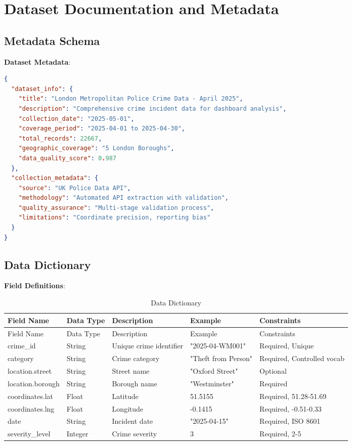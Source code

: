 \documentclass[12pt,a4paper]{article}
\begin{document}
\section{Dataset Documentation and Metadata}

\subsection{Metadata Schema}

\textbf{Dataset Metadata}:
\begin{lstlisting}[language=json, caption=Metadata Structure]
{
  "dataset_info": {
    "title": "London Metropolitan Police Crime Data - April 2025",
    "description": "Comprehensive crime incident data for dashboard analysis",
    "collection_date": "2025-05-01",
    "coverage_period": "2025-04-01 to 2025-04-30",
    "total_records": 22667,
    "geographic_coverage": "5 London Boroughs",
    "data_quality_score": 0.987
  },
  "collection_metadata": {
    "source": "UK Police Data API",
    "methodology": "Automated API extraction with validation",
    "quality_assurance": "Multi-stage validation process",
    "limitations": "Coordinate precision, reporting bias"
  }
}
\end{lstlisting}

\subsection{Data Dictionary}

\textbf{Field Definitions}:

\begin{longtable}{@{}p{3cm}p{2cm}p{4cm}p{3cm}p{3cm}@{}}
\caption{Data Dictionary} \\
\toprule
Field Name & Data Type & Description & Example & Constraints \\
\midrule
\endfirsthead
\toprule
Field Name & Data Type & Description & Example & Constraints \\
\midrule
\endhead
crime\_id & String & Unique crime identifier & "2025-04-WM001" & Required, Unique \\
category & String & Crime category & "Theft from Person" & Required, Controlled vocab \\
location.street & String & Street name & "Oxford Street" & Optional \\
location.borough & String & Borough name & "Westminster" & Required \\
coordinates.lat & Float & Latitude & 51.5155 & Required, 51.28-51.69 \\
coordinates.lng & Float & Longitude & -0.1415 & Required, -0.51-0.33 \\
date & String & Incident date & "2025-04-15" & Required, ISO 8601 \\
severity\_level & Integer & Crime severity & 3 & Required, 2-5 \\
\bottomrule
\end{longtable}
\end{document}
